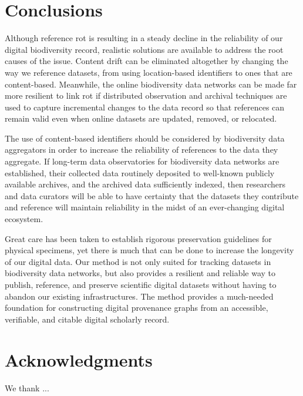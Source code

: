 \documentclass[10pt,letterpaper]{article}
\begin{document}
\section*{Conclusions} 

Although reference rot is resulting in a steady decline in the reliability of our digital biodiversity record, realistic solutions are available to address the root causes of the issue. Content drift can be eliminated altogether by changing the way we reference datasets, from using location-based identifiers to ones that are content-based. Meanwhile, the online biodiversity data networks can be made far more resilient to link rot if distributed observation and archival techniques are used to capture incremental changes to the data record so that references can remain valid even when online datasets are updated, removed, or relocated.  

The use of content-based identifiers should be considered by biodiversity data aggregators in order to increase the reliability of references to the data they aggregate. If long-term data observatories for biodiversity data networks are established, their collected data routinely deposited to well-known publicly available archives, and the archived data sufficiently indexed, then researchers and data curators will be able to have certainty that the datasets they contribute and reference will maintain reliability in the midst of an ever-changing digital ecosystem. 

Great care has been taken to establish rigorous preservation guidelines for physical specimens, yet there is much that can be done to increase the longevity of our digital data. Our method is not only suited for tracking datasets in biodiversity data networks, but also provides a resilient and reliable way to publish, reference, and preserve scientific digital datasets without having to abandon our existing infrastructures. The method provides a much-needed foundation for constructing digital provenance graphs from an accessible, verifiable, and citable digital scholarly record. 


\section*{Acknowledgments}
We thank ...

\nolinenumbers




\end{document}
